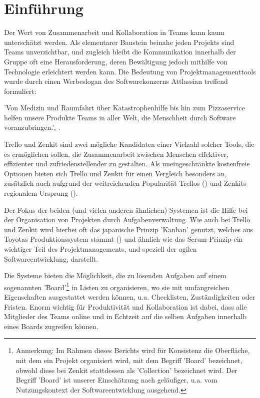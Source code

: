 \newpage
\section{Einführung}

Der Wert von Zusammenarbeit und Kollaboration in Teams kann kaum unterschätzt werden. Als elementarer Baustein beinahe jeden Projekts sind Teams unverzichtbar, und zugleich bleibt die Kommunikation innerhalb der Gruppe oft eine Herausforderung, deren Bewältigung jedoch mithilfe von Technologie erleichtert werden kann. Die Bedeutung von Projektmanagementtools wurde durch einen Werbeslogan des Softwarekonzerns Attlassian treffend formuliert:

'Von Medizin und Raumfahrt über Katastrophenhilfe bis hin zum Pizzaservice helfen unsere Produkte Teams in aller Welt, die Menschheit durch Software voranzubringen.', \cite{atlassianslogan}.

Trello und Zenkit sind zwei mögliche Kandidaten einer Vielzahl solcher Tools, die es ermöglichen sollen, die Zusammenarbeit zwischen Menschen effektiver, effizienter und zufriedenstellender zu gestalten. 
Als uneingeschränkte kostenfreie Optionen bieten sich Trello und Zenkit für einen Vergleich besonders an, zusätzlich auch aufgrund der weitreichenden Popularität Trellos (\cite{blogtrello}) und Zenkits regionalem Ursprung (\cite{zenkitinterview}).

Der Fokus der beiden (und vielen anderen ähnlichen) Systemen ist die Hilfe bei der  Organisation von Projekten durch Aufgabenverwaltung. Wie auch bei Trello und Zenkit wird hierbei oft das japanische Prinzip 'Kanban' genutzt, welches aus Toyotas Produktionssystem stammt (\cite{sugimori1977toyota}) und ähnlich wie das Scrum-Prinzip ein wichtiger Teil des Projektmanagements, und speziell der agilen Softwareentwicklung, darstellt. 

Die Systeme bieten die Möglichkeit, die zu lösenden Aufgaben auf einem sogenannten 'Board'\footnote{Anmerkung: Im Rahmen dieses Berichts wird für Konsistenz die Oberfläche, mit dem ein Projekt organisiert wird, mit dem Begriff 'Board' bezeichnet, obwohl diese bei Zenkit stattdessen als 'Collection' bezeichnet wird. Der Begriff 'Board' ist unserer Einschätzung nach geläufiger, u.a. vom Nutzungskontext der Softwareentwicklung ausgehend.}
in Listen zu organisieren, wo sie mit umfangreichen Eigenschaften ausgestattet werden können, u.a. Checklisten, Zuständigkeiten oder Fristen. Enorm wichtig für Produktivität und Kollaboration ist dabei, dass alle Mitglieder des Teams online und in Echtzeit auf die selben Aufgaben innerhalb eines Boards zugreifen können.

